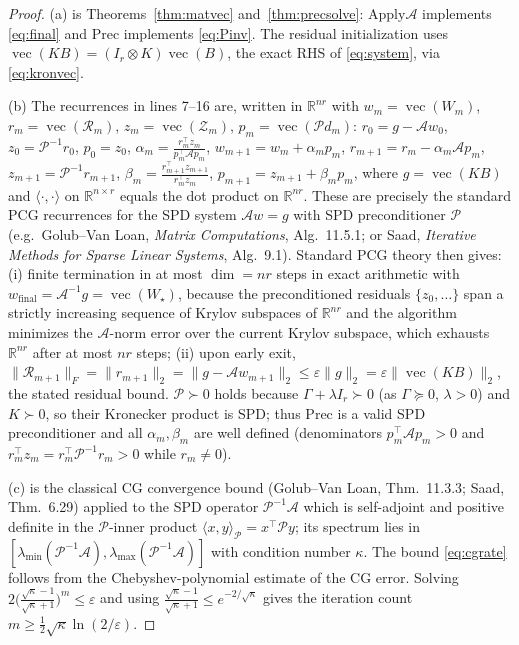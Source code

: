 \documentclass[12pt]{article}
\DeclareMathOperator{\vecop}{vec}
\newcommand{\bR}{\mathbb{R}}
\begin{document}
\begin{proof}
(a) is Theorems~\ref{thm:matvec} and~\ref{thm:precsolve}: $\mathrm{Apply}\mathcal A$
implements \eqref{eq:final} and $\mathrm{Prec}$ implements \eqref{eq:Pinv}. The
residual initialization uses $\vecop(KB)=(I_r\otimes K)\vecop(B)$, the exact RHS
of \eqref{eq:system}, via \eqref{eq:kronvec}.

(b) The recurrences in lines 7--16 are, written in $\bR^{nr}$ with
$w_m=\vecop(W_m)$, $r_m=\vecop(\mathcal R_m)$, $z_m=\vecop(\mathcal Z_m)$,
$p_m=\vecop(\mathcal Pd_m)$:
$r_0=g-\mathcal A w_0$, $z_0=\mathcal P^{-1}r_0$, $p_0=z_0$,
$\alpha_m=\frac{r_m^{\!\top}z_m}{p_m^{\!\top}\mathcal A p_m}$,
$w_{m+1}=w_m+\alpha_m p_m$, $r_{m+1}=r_m-\alpha_m\mathcal A p_m$,
$z_{m+1}=\mathcal P^{-1}r_{m+1}$,
$\beta_m=\frac{r_{m+1}^{\!\top}z_{m+1}}{r_m^{\!\top}z_m}$,
$p_{m+1}=z_{m+1}+\beta_m p_m$, where $g=\vecop(KB)$ and $\langle\cdot,\cdot\rangle$
on $\bR^{n\times r}$ equals the dot product on $\bR^{nr}$. These are precisely the
standard PCG recurrences for the SPD system $\mathcal A w=g$ with SPD
preconditioner $\mathcal P$ (e.g.\ Golub--Van Loan, \emph{Matrix Computations},
Alg.~11.5.1; or Saad, \emph{Iterative Methods for Sparse Linear Systems},
Alg.~9.1). Standard PCG theory then gives: (i) finite termination in at most
$\dim=nr$ steps in exact arithmetic with $w_{\text{final}}=\mathcal A^{-1}g=
\vecop(W_\star)$, because the preconditioned residuals
$\{z_0,\dots\}$ span a strictly increasing sequence of Krylov subspaces of
$\bR^{nr}$ and the algorithm minimizes the $\mathcal A$-norm error over the
current Krylov subspace, which exhausts $\bR^{nr}$ after at most $nr$ steps; (ii)
upon early exit, $\|\mathcal R_{m+1}\|_F=\|r_{m+1}\|_2=\|g-\mathcal A w_{m+1}\|_2
\le\varepsilon\|g\|_2=\varepsilon\|\vecop(KB)\|_2$, the stated residual bound.
$\mathcal P\succ0$ holds because $\Gamma+\lambda I_r\succ0$ (as $\Gamma\succeq0$,
$\lambda>0$) and $K\succ0$, so their Kronecker product is SPD; thus
$\mathrm{Prec}$ is a valid SPD preconditioner and all $\alpha_m,\beta_m$ are well
defined (denominators $p_m^{\!\top}\mathcal A p_m>0$ and $r_m^{\!\top}z_m=
r_m^{\!\top}\mathcal P^{-1}r_m>0$ while $r_m\ne0$).

(c) is the classical CG convergence bound (Golub--Van Loan, Thm.~11.3.3; Saad,
Thm.~6.29) applied to the SPD operator $\mathcal P^{-1}\mathcal A$ which is
self-adjoint and positive definite in the $\mathcal P$-inner product
$\langle x,y\rangle_{\mathcal P}=x^{\!\top}\mathcal P y$; its spectrum lies in
$[\lambda_{\min}(\mathcal P^{-1}\mathcal A),\lambda_{\max}(\mathcal P^{-1}
\mathcal A)]$ with condition number $\kappa$. The bound \eqref{eq:cgrate} follows
from the Chebyshev-polynomial estimate of the CG error. Solving
$2\big(\frac{\sqrt\kappa-1}{\sqrt\kappa+1}\big)^m\le\varepsilon$ and using
$\frac{\sqrt\kappa-1}{\sqrt\kappa+1}\le e^{-2/\sqrt\kappa}$ gives the iteration
count $m\ge\frac12\sqrt\kappa\ln(2/\varepsilon)$.
\end{proof}
\end{document}
